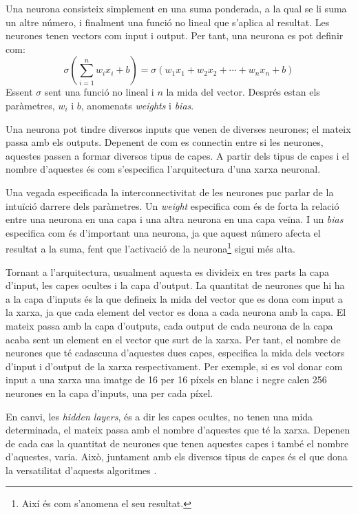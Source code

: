Una neurona consisteix simplement en una suma ponderada, a la qual se li suma un altre número, i finalment una funció no lineal que s'aplica al resultat. Les neurones tenen vectors com input i output. Per tant, una neurona es pot definir com:
$$
\sigma \left(\sum_{i=1}^n w_i x_i + b\right) = \sigma \left( w_1x_1 + w_2x_2 + \cdots + w_nx_n + b 
\right) 
$$
Essent $\sigma$ sent una funció no lineal i $n$ la mida del vector. Després estan els paràmetres, $w_i$ i $b$, anomenats \textit{weights} i \textit{bias}.

Una neurona pot tindre diversos inputs que venen de diverses neurones; el mateix passa amb els outputs. Depenent de com es connectin entre si les neurones, aquestes passen a formar diversos tipus de capes. A partir dels tipus de capes i el nombre d'aquestes és com s'especifica l'arquitectura d'una xarxa neuronal.

Una vegada especificada la interconnectivitat de les neurones puc parlar de la intuïció darrere dels paràmetres. Un \textit{weight} especifica com és de forta la relació entre una neurona en una capa i una altra neurona en una capa veïna. I un \textit{bias} especifica com és d'important una neurona, ja que aquest número afecta el resultat a la suma, fent que l'activació de la neurona\footnote{Així és com s'anomena el seu resultat.} sigui més alta.

Tornant a l'arquitectura, usualment aquesta es divideix en tres parts la capa d'input, les capes ocultes i la capa d'output. La quantitat de neurones que hi ha a la capa d'inputs és la que defineix la mida del vector que es dona com input a la xarxa, ja que cada element del vector es dona a cada neurona amb la capa. El mateix passa amb la capa d'outputs, cada output de cada neurona de la capa acaba sent un element en el vector que surt de la xarxa. Per tant, el nombre de neurones que té cadascuna d'aquestes dues capes, especifica la mida dels vectors d'input i d'output de la xarxa respectivament. Per exemple, si es vol donar com input a una xarxa una imatge de 16 per 16 píxels en blanc i negre calen 256 neurones en la capa d'inputs, una per cada píxel.

En canvi, les \textit{hidden layers}, és a dir les capes ocultes, no tenen una mida determinada, el mateix passa amb el nombre d'aquestes que té la xarxa. Depenen de cada cas la quantitat de neurones que tenen aquestes capes i també el nombre d'aquestes, varia. Això, juntament amb els diversos tipus de capes és el que dona la versatilitat d'aquests algoritmes \cite{DL:feedforward}.

